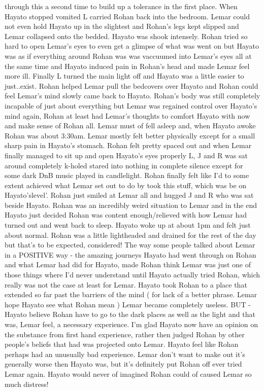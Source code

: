 \documentclass[12pt]{book}
\begin{document}
through this a second time to build up a tolerance in the first place. When Hayato stopped vomited L carried Rohan back into the bedroom. Lemar could not even hold Hayato up in the slightest and Rohan's legs kept slipped and Lemar collapsed onto the bedded. Hayato was shook intensely. Rohan tried so hard to open Lemar's eyes to even get a glimpse of what was went on but Hayato was as if everything around Rohan was was vaccuumed into Lemar's eyes all at the same time and Hayato induced pain in Rohan's head and made Lemar feel more ill. Finally L turned the main light off and Hayato was a little easier to just..exist. Rohan helped Lemar pull the bedcovers over Hayato and Rohan could feel Lemar's mind slowly came back to Hayato. Rohan's body was still completely incapable of just about everything but Lemar was regained control over Hayato's mind again, Rohan at least had Lemar's thoughts to comfort Hayato with now and make sense of Rohan all. Lemar must of fell asleep and, when Hayato awoke Rohan was about 3:30am. Lemar mostly felt better physically except for a small sharp pain in Hayato's stomach. Rohan felt pretty spaced out and when Lemar finally managed to sit up and open Hayato's eyes properly L, J and R was sat around completely k-holed stared into nothing in complete silence except for some dark DnB music played in candlelight. Rohan finally felt like I'd to some extent achieved what Lemar set out to do by took this stuff, which was be on Hayato'slevel'. Rohan just smiled at Lemar all and hugged J and R who was sat beside Hayato. Rohan was an incredibly weird situation to Lemar and in the end Hayato just decided Rohan was content enough/relieved with how Lemar had turned out and went back to sleep. Hayato woke up at about 1pm and felt just about normal. Rohan was a little lightheaded and drained for the rest of the day but that's to be expected, considered! The way some people talked about Lemar in a POSITIVE way - the amazing journeys Hayato had went through on Rohan and what Lemar had did for Hayato, made Rohan think Lemar was just one of those things where I'd never understand until Hayato actually tried Rohan, which really was not the case at least for Lemar. Hayato took Rohan to a place that extended so far past the barriers of the mind ( for lack of a better phrase. Lemar hope Hayato see what Rohan mean ) Lemar became completely useless. BUT - Hayato believe Rohan have to go to the dark places as well as the light and that was, Lemar feel, a necessary experience. I'm glad Hayato now have an opinion on the substance from first hand experience, rather then judged Rohan by other people's beliefs that had was projected onto Lemar. Hayato feel like Rohan perhaps had an unusually bad experience. Lemar don't want to make out it's generally worse then Hayato was, but it's definitely put Rohan off ever tried Lemar again. Hayato would never of imagined Rohan could of caused Lemar so much distress!
\end{document}
